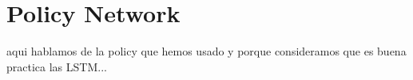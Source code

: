     

\section{Policy Network}\label{sec:spacerl-policy}
aqui hablamos de la policy que hemos usado y porque consideramos que es buena practica las LSTM...


%     



